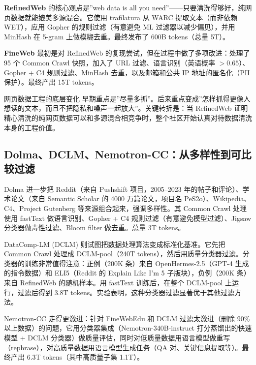 \documentclass[a4paper]{article}
\begin{document}
\textbf{RefinedWeb} 的核心观点是”web data is all you need”——只要清洗得够好，纯网页数据就能媲美多源混合。它使用 trafilatura 从 WARC 提取文本（而非依赖 WET），应用 Gopher 的规则过滤（有意避免 ML 过滤器以减少偏见），并用 MinHash 在 5-gram 上做模糊去重。最终发布了 600B tokens（总量 5T）。

\textbf{FineWeb} 最初是对 RefinedWeb 的复现尝试，但在过程中做了多项改进：处理了 95 个 Common Crawl 快照，加入了 URL 过滤、语言识别（英语概率 $> 0.65$）、Gopher + C4 规则过滤、MinHash 去重，以及邮箱和公共 IP 地址的匿名化（PII 保护）。最终产出 15T tokens。

\begin{importantbox}{网页数据工程的底层变化}
早期重点是”尽量多抓”。后来重点变成”怎样抓得更像人想读的文本，而且不把隐私和噪声一起放大”。关键转折是：当 RefinedWeb 证明精心清洗的纯网页数据可以和多源混合相竞争时，整个社区开始认真对待数据清洗本身的工程价值。
\end{importantbox}

\subsection{Dolma、DCLM、Nemotron-CC：从多样性到可比较过滤}

Dolma 进一步把 Reddit（来自 Pushshift 项目，2005--2023 年的帖子和评论）、学术论文（来自 Semantic Scholar 的 4000 万篇论文，项目名 PeS2o）、Wikipedia、C4、Project Gutenberg 等来源组合起来，强调多样性。其 Common Crawl 处理使用 fastText 做语言识别、Gopher + C4 规则过滤（有意避免模型过滤）、Jigsaw 分类器做毒性过滤、Bloom filter 做去重。总量 3T tokens。

DataComp-LM (DCLM) 则试图把数据处理算法变成标准化基准。它先把 Common Crawl 处理成 DCLM-pool（240T tokens），然后用质量分类器过滤。分类器的训练非常值得注意：正例（200K 条）来自 OpenHermes-2.5（GPT-4 生成的指令数据）和 ELI5（Reddit 的 Explain Like I'm 5 子版块），负例（200K 条）来自 RefinedWeb 的随机样本。用 fastText 训练后，在整个 DCLM-pool 上运行，过滤后得到 3.8T tokens。实验表明，这种分类器过滤显著优于其他过滤方法。

Nemotron-CC 走得更激进：针对 FineWebEdu 和 DCLM 过滤太激进（删除 90\% 以上数据）的问题，它用分类器集成（Nemotron-340B-instruct 打分蒸馏出的快速模型 + DCLM 分类器）做质量评估，同时对低质量数据用语言模型做重写（rephrase），对高质量数据用语言模型生成任务（QA 对、关键信息提取等）。最终产出 6.3T tokens（其中高质量子集 1.1T）。
\end{document}
